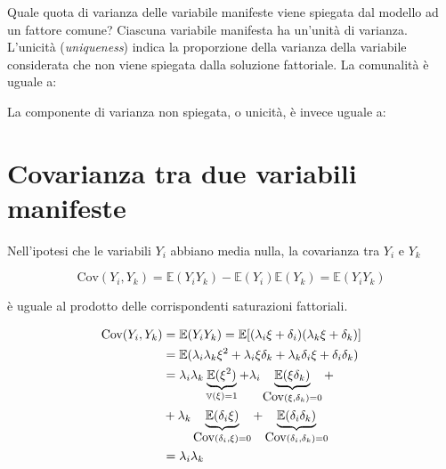 \documentclass[
  11pt,
]{krantz}
\makeatletter
\newenvironment{Shaded}{\begin{snugshade}}{\end{snugshade}}
\newcommand{\CommentTok}[1]{\textcolor[rgb]{0.37,0.37,0.37}{\textit{#1}}}
\newcommand{\DecValTok}[1]{\textcolor[rgb]{0.06,0.06,0.06}{#1}}
\newcommand{\FunctionTok}[1]{\textcolor[rgb]{0,0,0}{#1}}
\newcommand{\NormalTok}[1]{#1}
\newcommand{\SpecialCharTok}[1]{\textcolor[rgb]{0,0,0}{#1}}
\newenvironment{kframe}{%
\medskip{}
\setlength{\fboxsep}{.8em}
 \def\at@end@of@kframe{}%
 \ifinner\ifhmode%
  \def\at@end@of@kframe{\end{minipage}}%
  \begin{minipage}{\columnwidth}%
 \fi\fi%
 \def\FrameCommand##1{\hskip\@totalleftmargin \hskip-\fboxsep
 \colorbox{shadecolor}{##1}\hskip-\fboxsep
     \hskip-\linewidth \hskip-\@totalleftmargin \hskip\columnwidth}%
 \MakeFramed {\advance\hsize-\width
   \@totalleftmargin\z@ \linewidth\hsize
   \@setminipage}}%
 {\par\unskip\endMakeFramed%
 \at@end@of@kframe}
\renewenvironment{Shaded}{\begin{kframe}}{\end{kframe}}
\DeclareMathOperator{\V}{\mathbb{V}} %
\newcommand{\E}{\mathbb{E}} %
\theoremstyle{definition}
\theoremstyle{definition}
\theoremstyle{definition}
\theoremstyle{definition}
\theoremstyle{remark}
\makeatother
\begin{document}
Quale quota di varianza delle variabile manifeste viene spiegata dal modello ad un fattore comune? Ciascuna variabile manifesta ha un'unità di varianza. L'unicità (\emph{uniqueness}) indica la proporzione della varianza della variabile considerata che non viene spiegata dalla soluzione fattoriale. La comunalità è uguale a:

\begin{Shaded}
\end{Shaded}

La componente di varianza non spiegata, o unicità, è invece uguale a:

\begin{Shaded}
\end{Shaded}

\hypertarget{covarianza-tra-due-variabili-manifeste}{%
\section{Covarianza tra due variabili manifeste}\label{covarianza-tra-due-variabili-manifeste}}

Nell'ipotesi che le variabili \(Y_i\) abbiano media nulla, la covarianza tra \(Y_i\) e \(Y_k\)

\[
\mbox{Cov}(Y_i, Y_k)=\E(Y_i Y_k) -
\E(Y_i)\E(Y_k)=\E(Y_i Y_k)
\]

è uguale al prodotto delle corrispondenti saturazioni fattoriali.

\begin{equation}
\begin{aligned}
 \mbox{Cov}(Y_i, Y_k) &= \E(Y_i Y_k)=\E[(\lambda_i \xi + \delta_i)(\lambda_k \xi +  \delta_k)]\notag\\
  &=\E(\lambda_i\lambda_k\xi^2 + \lambda_i  \xi \delta_k + \lambda_k \delta_i \xi + \delta_i \delta_k)\notag\\
&=\lambda_i\lambda_k\underbrace{\E(\xi^2)}_{\V(\xi)=1}+\lambda_i\underbrace{\E(\xi \delta_k)}_{\mbox{Cov}(\xi, \delta_k) =0}+\notag\\ \;&+\lambda_k\underbrace{\E(\delta_i \xi)}_{\mbox{Cov}(\delta_i, \xi) =0} +\underbrace{\E(\delta_i \delta_k)}_{\mbox{Cov}(\delta_i, \delta_k)=0}\notag\\
  &=\lambda_i\lambda_k
\end{aligned}
\end{equation}
\end{document}
